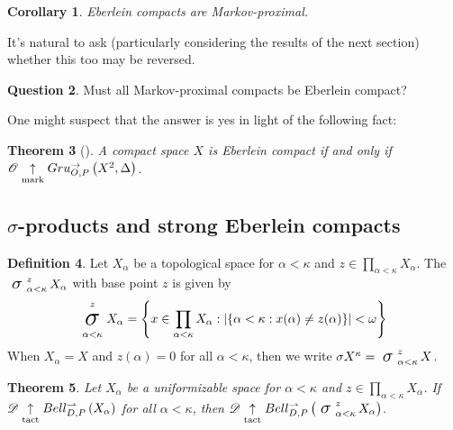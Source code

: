 \documentclass{amsart}
\newtheorem{theorem}{Theorem}[section]
\newtheorem{corollary}[theorem]{Corollary}
\theoremstyle{definition}
\newtheorem{definition}[theorem]{Definition}
\newtheorem{question}[theorem]{Question}
\begin{document}
  \begin{corollary}
    Eberlein compacts are Markov-proximal.
  \end{corollary}

  It's natural to ask (particularly considering the results of the next
  section) whether this too may be reversed.

  \begin{question}\label{mainQuestion}
    Must all Markov-proximal compacts be Eberlein compact?
  \end{question}

  One might suspect that the answer is yes in light of the following fact:

  \begin{theorem}[\cite{MR858337}]
    A compact space \(X\) is Eberlein compact if and only if
    \(\mathscr{O}\underset{\text{mark}}{\uparrow}Gru_{O,P}^{\to}\left({X^2},{\Delta}\right)\).
  \end{theorem}

\subsection{\(\sigma\)-products and strong Eberlein compacts}

  \begin{definition}
    Let \(X_\alpha\) be a topological space for \(\alpha<\kappa\)
    and \(z\in\prod_{\alpha<\kappa}X_\alpha\).
    The  \(\sigmaProd_{\alpha<\kappa}^{z}X_\alpha\)
    with base point \(z\) is given by
    \[
      \sigmaProd_{\alpha<\kappa}^{z}X_\alpha
        =
      \left\{
        x\in \prod_{\alpha<\kappa}X_\alpha
      :
        |\{\alpha<\kappa:x(\alpha)\not=z(\alpha)\}|<\omega
      \right\}
    \]
    When \(X_\alpha=X\) and \(z(\alpha)=0\) for all \(\alpha<\kappa\),
    then we write \(\sigmaPower{X}{\kappa}=\sigmaProd_{\alpha<\kappa}^z X\).
  \end{definition}

  \begin{theorem}
    Let \(X_\alpha\) be a uniformizable space for \(\alpha<\kappa\)
    and \(z\in \prod_{\alpha<\kappa}X_\alpha\).
    If
    \(\mathscr{D}\underset{\text{tact}}{\uparrow}Bell_{D,P}^{\rightharpoonup}\left({X_\alpha}\right)\) for all \(\alpha<\kappa\),
    then
    \(\pl D\tactwin\bellConGame{\sigmaProd_{\alpha<\kappa}^z X_\alpha}\).
  \end{theorem}
\end{document}
